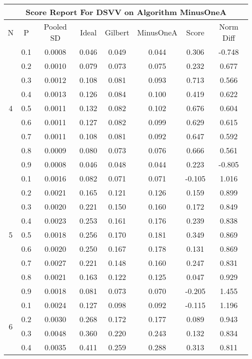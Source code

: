 \documentclass[11pt,a4paper]{report}
\begin{document}
\begin{longtable}{ | c | c || c | c | c | c | c | c | }
\hline
\multicolumn{8}{|c|}{ Score Report For DSVV on Algorithm MinusOneA} \\
\hline
N & P & Pooled SD &  Ideal &  Gilbert & MinusOneA  & Score & Norm Diff \\
 \hline
 \hline
 \endhead
\multirow{9}{*}{4} & 0.1 & 0.0008 & 0.046 & 0.049 & 0.044 & 0.306 & -0.748 \\
 & 0.2 & 0.0010 & 0.079 & 0.073 & 0.075 & 0.232 & 0.677 \\
 & 0.3 & 0.0012 & 0.108 & 0.081 & 0.093 & 0.713 & 0.566 \\
 & 0.4 & 0.0013 & 0.126 & 0.084 & 0.100 & 0.419 & 0.622 \\
 & 0.5 & 0.0011 & 0.132 & 0.082 & 0.102 & 0.676 & 0.604 \\
 & 0.6 & 0.0011 & 0.127 & 0.082 & 0.099 & 0.629 & 0.615 \\
 & 0.7 & 0.0011 & 0.108 & 0.081 & 0.092 & 0.647 & 0.592 \\
 & 0.8 & 0.0009 & 0.080 & 0.073 & 0.076 & 0.666 & 0.561 \\
 & 0.9 & 0.0008 & 0.046 & 0.048 & 0.044 & 0.223 & -0.805 \\
 \hline
\multirow{9}{*}{5} & 0.1 & 0.0016 & 0.082 & 0.071 & 0.071 & -0.105 & 1.016 \\
 & 0.2 & 0.0021 & 0.165 & 0.121 & 0.126 & 0.159 & 0.899 \\
 & 0.3 & 0.0020 & 0.221 & 0.150 & 0.160 & 0.172 & 0.849 \\
 & 0.4 & 0.0023 & 0.253 & 0.161 & 0.176 & 0.239 & 0.838 \\
 & 0.5 & 0.0018 & 0.256 & 0.170 & 0.181 & 0.349 & 0.869 \\
 & 0.6 & 0.0020 & 0.250 & 0.167 & 0.178 & 0.131 & 0.869 \\
 & 0.7 & 0.0027 & 0.221 & 0.148 & 0.160 & 0.247 & 0.831 \\
 & 0.8 & 0.0021 & 0.163 & 0.122 & 0.125 & 0.047 & 0.929 \\
 & 0.9 & 0.0018 & 0.081 & 0.073 & 0.070 & -0.205 & 1.455 \\
 \hline
\multirow{9}{*}{6} & 0.1 & 0.0024 & 0.127 & 0.098 & 0.092 & -0.115 & 1.196 \\
 & 0.2 & 0.0030 & 0.268 & 0.172 & 0.177 & 0.089 & 0.943 \\
 & 0.3 & 0.0048 & 0.360 & 0.220 & 0.243 & 0.132 & 0.834 \\
 & 0.4 & 0.0035 & 0.411 & 0.259 & 0.288 & 0.313 & 0.811 \\

\end{longtable}
\end{document}
